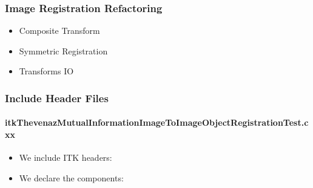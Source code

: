 
\begin{frame}
\frametitle{Image Registration Refactoring}
\Huge
\begin{itemize}
\item Composite Transform
\pause
\item Symmetric Registration
\pause
\item Transforms IO
\end{itemize}
\end{frame}



\begin{frame}
\frametitle{Include Header Files}
\framesubtitle{itkThevenazMutualInformationImageToImageObjectRegistrationTest.cxx}
\tiny
\begin{itemize}
\item We include ITK headers:
\item We declare the components:
\end{itemize}
\end{frame}



